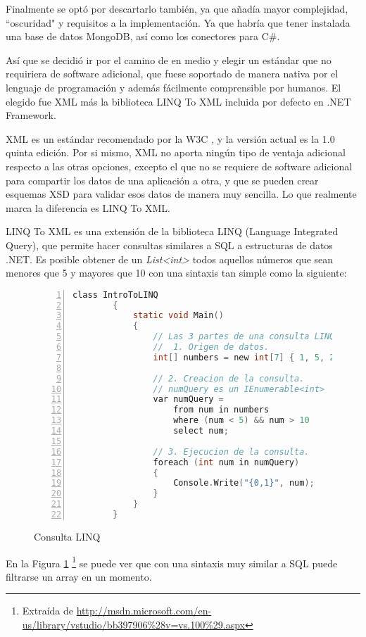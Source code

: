 Finalmente se opt\'o por descartarlo tambi\'en, ya que a\~nad\'ia mayor complejidad, ``oscuridad" y requisitos a la 
implementaci\'on. Ya que habr\'ia que tener instalada una base de datos MongoDB, as\'i como los conectores para
C\#.

As\'i que se decidi\'o ir por el camino de en medio y elegir un est\'andar que no requiriera de software adicional,
que fuese soportado de manera nativa por el lenguaje de programaci\'on y adem\'as f\'acilmente comprensible por
humanos. El elegido fue XML m\'as la biblioteca LINQ To XML incluida por defecto en .NET Framework. 

XML es un est\'andar recomendado por la W3C \cite{XML:Specification}, y la versi\'on actual es la 1.0 quinta edici\'on.
Por si mismo, XML no aporta ning\'un tipo de ventaja adicional respecto a las otras opciones, excepto el que no se
requiere de software adicional para compartir los datos de una aplicaci\'on a otra, y que
se pueden crear esquemas XSD para validar esos datos de manera muy sencilla. 
Lo que realmente marca
la diferencia es LINQ To XML.

LINQ To XML es una extensi\'on de la biblioteca LINQ (Language Integrated Query), que permite hacer consultas
similares a SQL a estructuras de datos .NET. Es posible obtener de un \emph{List<int>} todos aquellos n\'umeros
que sean menores que 5 y mayores que 10 con una sintaxis tan simple como la siguiente:

\begin{figure}[H]
	\begin{lstlisting}[tabsize=2, language=C, numbers=left, showspaces=false, breaklines=true]
		class IntroToLINQ
		{        
			static void Main()
			{
				// Las 3 partes de una consulta LINQ:
				//  1. Origen de datos.
				int[] numbers = new int[7] { 1, 5, 20, -4, 7, 8, 9};
				
				// 2. Creacion de la consulta.
				// numQuery es un IEnumerable<int>
				var numQuery =
					from num in numbers
					where (num < 5) && num > 10
					select num;
				
				// 3. Ejecucion de la consulta.
				foreach (int num in numQuery)
				{
					Console.Write("{0,1}", num);
				}
			}
		}
	\end{lstlisting}
	\caption[Consulta LINQ]{Consulta LINQ}
	\label{Consulta LINQ}
\end{figure}

En la Figura \ref{Consulta LINQ}
\footnote{Extra\'ida de \url{http://msdn.microsoft.com/en-us/library/vstudio/bb397906\%28v=vs.100\%29.aspx}}
se puede ver que con una sintaxis muy similar a SQL puede filtrarse un array en un momento.

